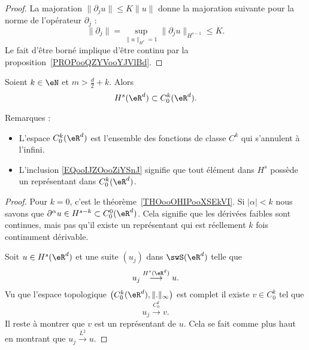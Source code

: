 \begin{proof}
	La majoration \( \| \partial_ju \|\leq K\| u \|\) donne la majoration suivante pour la norme de l'opérateur \( \partial_j\) :
	\begin{equation}
		\| \partial_j \|=\sup_{\| u \|_{H^s}=1}\| \partial_ju \|_{H^{s-1}}\leq K.
	\end{equation}
	Le fait d'être borné implique d'être continu par la proposition~\ref{PROPooQZYVooYJVlBd}.
\end{proof}

\begin{theorem}
	Soient \( k\in \eN\) et \( m>\frac{ d }{ 2 }+k\). Alors
	\begin{equation}        \label{EQooIJZOooZiYSnJ}
		H^s(\eR^d)\subset C_0^k(\eR^d).
	\end{equation}
\end{theorem}

Remarques :
\begin{itemize}
	\item
	      L'espace \( C_0^k(\eR^d)\) est l'ensemble des fonctions de classe \( C^k\) qui s'annulent à l'infini.
	\item
	      L'inclusion \eqref{EQooIJZOooZiYSnJ} signifie que tout élément dans \( H^s\) possède un représentant dans \( C_0^k(\eR^d)\).
\end{itemize}

\begin{proof}
	Pour \( k=0\), c'est le théorème~\ref{THOooOHIPooXSEkVI}. Si \( | \alpha |<k\) nous savons que \( \partial^{\alpha}u\in H^{s-k}\subset C_0^0(\eR^d) \). Cela signifie que les dérivées faibles sont continues, mais pas qu'il existe un représentant qui est réellement \( k\) fois continument dérivable.

	Soit \( u\in H^s(\eR^d)\) et une suite \( (u_j)  \) dans \( \swS(\eR^d)\) telle que
	\begin{equation}
		u_j\stackrel{H^s(\eR^d)}{\longrightarrow}u.
	\end{equation}
	Vu que l'espace topologique \( \big( C_0^k(\eR^d),\| . \|_{\infty} \big)\) est complet il existe \( v\in C_0^k\) tel que
	\begin{equation}
		u_j\stackrel{C_0^k}{\longrightarrow}v.
	\end{equation}
	Il reste à montrer que \( v\) est un représentant de \( u\). Cela se fait comme plus haut en montrant que \( u_j\stackrel{L^2}{\longrightarrow}u\).
\end{proof}
